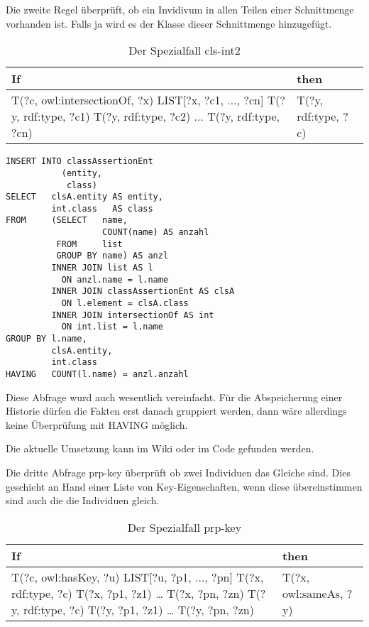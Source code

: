 Die zweite Regel überprüft, ob ein Invidivum in allen Teilen einer Schnittmenge vorhanden ist. Falls ja wird es der Klasse dieser Schnittmenge hinzugefügt.
\begin{table}
\begin{tabular}{l|l}
If & then \\ \hline
T(?c, owl:intersectionOf, ?x)
LIST[?x, ?c1, ..., ?cn]
T(?y, rdf:type, ?c1)
T(?y, rdf:type, ?c2)
...
T(?y, rdf:type, ?cn) & T(?y, rdf:type, ?c) 	 
\end{tabular}
\caption{Der Spezialfall cls-int2}
\label{rule-cls-int2}
\end{table}


\begin{lstlisting}
INSERT INTO classAssertionEnt
           (entity,
            class)
SELECT   clsA.entity AS entity,
         int.class   AS class
FROM     (SELECT   name,
                   COUNT(name) AS anzahl
          FROM     list
          GROUP BY name) AS anzl
         INNER JOIN list AS l
           ON anzl.name = l.name
         INNER JOIN classAssertionEnt AS clsA
           ON l.element = clsA.class
         INNER JOIN intersectionOf AS int
           ON int.list = l.name
GROUP BY l.name,
         clsA.entity,
         int.class
HAVING   COUNT(l.name) = anzl.anzahl
\end{lstlisting}

Diese Abfrage wurd auch wesentlich vereinfacht. Für die Abspeicherung einer Historie dürfen die Fakten erst danach gruppiert werden, dann wäre allerdings keine Überprüfung mit HAVING möglich.

Die aktuelle Umsetzung kann im Wiki oder im Code gefunden werden.

Die dritte Abfrage prp-key überprüft ob zwei Individuen das Gleiche sind. Dies geschieht an Hand einer Liste  von Key-Eigenschaften, wenn diese übereinstimmen sind auch die die Individuen gleich.
\begin{table}
\begin{tabular}{l|l}
If & then \\ \hline
T(?c, owl:hasKey, ?u)
LIST[?u, ?p1, ..., ?pn]
T(?x, rdf:type, ?c)
T(?x, ?p1, ?z1)
\ldots
T(?x, ?pn, ?zn)
T(?y, rdf:type, ?c)
T(?y, ?p1, ?z1)
\ldots
T(?y, ?pn, ?zn) & T(?x, owl:sameAs, ?y)
\end{tabular}
\caption{Der Spezialfall prp-key}
\label{rule-prp-key}
\end{table}


